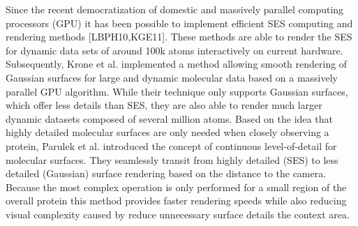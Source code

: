 Since the recent democratization of domestic and massively parallel computing processors (GPU) it has been possible to implement efficient SES computing and rendering methods [LBPH10,KGE11].
These methods are able to render the SES for dynamic data sets of around 100k atoms interactively on current hardware.
Subsequently, Krone et al. implemented a method allowing smooth rendering of Gaussian surfaces for large and dynamic molecular data based on a massively parallel GPU algorithm. 
While their technique only supports Gaussian surfaces, which offer less details than SES, they are also able to render much larger dynamic datasets composed of several million atoms.
Based on the idea that highly detailed molecular surfaces are only needed when closely observing a protein, Parulek et al. introduced the concept of continuous level-of-detail for molecular surfaces.
They seamlessly transit from highly detailed (SES) to less detailed (Gaussian) surface rendering based on the distance to the camera.
Because the most complex operation is only performed for a small region of the overall protein this method provides faster rendering speeds while also reducing visual complexity caused by reduce unnecessary surface details the context area.


